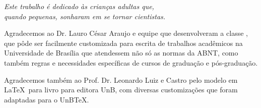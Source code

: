 \documentclass[
	12pt,				%
	openright,			%
	oneside,			%
	a4paper,			%
	sumario=tradicional,
	english,           %
	brazil             %
	]{unbtex}
\begin{document}
\begin{dedicatoria}
   \centering
   \vspace*{\fill}
   
   \textit{Este trabalho é dedicado às crianças adultas que,\\
   quando pequenas, sonharam em se tornar cientistas.} \\
   
   \vspace*{\fill}
\end{dedicatoria}

\begin{agradecimentos}

Agradecemos ao Dr. Lauro César Araujo e equipe que desenvolveram a classe \abnTeX, que pôde ser facilmente customizada para escrita de trabalhos acadêmicos na Universidade de Brasília que atendessem não só as normas da ABNT, como também regras e necessidades específicas de cursos de graduação e pós-graduação.

Agradecemos também ao Prof. Dr. Leonardo Luiz e Castro pelo modelo em \LaTeX\ para livro para editora UnB, com diversas customizações que foram adaptadas para o UnB\TeX.


\end{agradecimentos}
\end{document}
